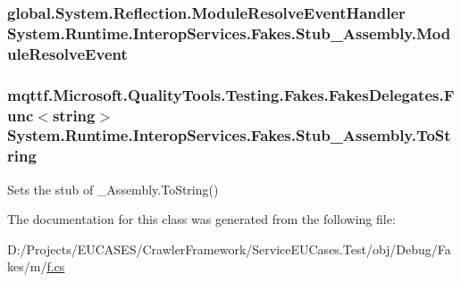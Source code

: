 \hypertarget{class_system_1_1_runtime_1_1_interop_services_1_1_fakes_1_1_stub___assembly_a2fa9fea180751afc3ad7a8543de217f2}{
\subsubsection[{Module\-Resolve\-Event}]{\setlength{\rightskip}{0pt plus 5cm}global.\-System.\-Reflection.\-Module\-Resolve\-Event\-Handler System.\-Runtime.\-Interop\-Services.\-Fakes.\-Stub\-\_\-\-Assembly.\-Module\-Resolve\-Event}}\label{class_system_1_1_runtime_1_1_interop_services_1_1_fakes_1_1_stub___assembly_a2fa9fea180751afc3ad7a8543de217f2}
\hypertarget{class_system_1_1_runtime_1_1_interop_services_1_1_fakes_1_1_stub___assembly_a286437b523dab32377fff99c02616ba8}{
\subsubsection[{To\-String}]{\setlength{\rightskip}{0pt plus 5cm}mqttf.\-Microsoft.\-Quality\-Tools.\-Testing.\-Fakes.\-Fakes\-Delegates.\-Func$<$string$>$ System.\-Runtime.\-Interop\-Services.\-Fakes.\-Stub\-\_\-\-Assembly.\-To\-String}}\label{class_system_1_1_runtime_1_1_interop_services_1_1_fakes_1_1_stub___assembly_a286437b523dab32377fff99c02616ba8}


Sets the stub of \-\_\-\-Assembly.\-To\-String()



The documentation for this class was generated from the following file\-:\begin{DoxyCompactItemize}
\item 
D\-:/\-Projects/\-E\-U\-C\-A\-S\-E\-S/\-Crawler\-Framework/\-Service\-E\-U\-Cases.\-Test/obj/\-Debug/\-Fakes/m/\hyperlink{m_2f_8cs}{f.\-cs}\end{DoxyCompactItemize}
